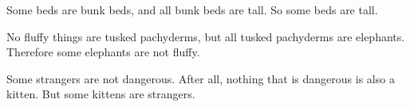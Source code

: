 \begin{exercises} 
 
\item  Some beds are bunk beds, and all bunk beds are tall. So some beds are tall.  



\item No fluffy things are tusked pachyderms, but all tusked pachyderms are elephants. Therefore some elephants are not fluffy.

 
\item Some strangers are not dangerous. After all, nothing that is dangerous is also a kitten. But some kittens are strangers. 


\end{exercises}
